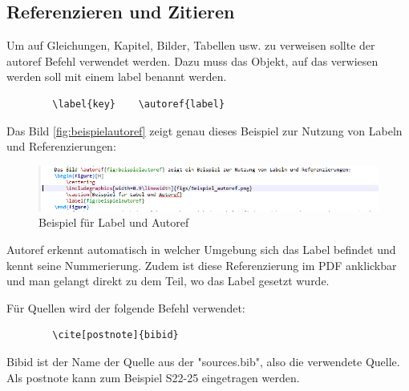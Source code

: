 \documentclass[
12pt,
a4paper,
headings=small,                    %
bibliography=totoc,                %
listof=totoc,                      %
parskip=half*,                     %
]{scrartcl}                        %
\begin{document}
	\subsection{Referenzieren und Zitieren}
	Um auf Gleichungen, Kapitel, Bilder, Tabellen usw. zu verweisen sollte der autoref Befehl verwendet werden. Dazu muss das Objekt, auf das verwiesen werden soll mit einem label benannt werden.
	\begin{verbatim}
		\label{key}    \autoref{label}
	\end{verbatim}
	Das Bild \autoref{fig:beispielautoref} zeigt genau dieses Beispiel zur Nutzung von Labeln und Referenzierungen:
	\begin{figure}[H]
		\centering
		\includegraphics[width=1.0\linewidth]{figs/Beispiel_autoref.png}
		\caption{Beispiel für Label und Autoref}
		\label{fig:beispielautoref}
	\end{figure}
	Autoref erkennt automatisch in welcher Umgebung sich das Label befindet und kennt seine Nummerierung. Zudem ist diese Referenzierung im PDF anklickbar und man gelangt direkt zu dem Teil, wo das Label gesetzt wurde.\newline\newline
	
	Für Quellen wird der folgende Befehl verwendet:
	\begin{verbatim}
		\cite[postnote]{bibid}
	\end{verbatim}
	Bibid ist der Name der Quelle aus der "sources.bib", also die verwendete Quelle.\newline
	Als postnote kann zum Beispiel S22-25 eingetragen werden.
	
	\newpage
\end{document}
